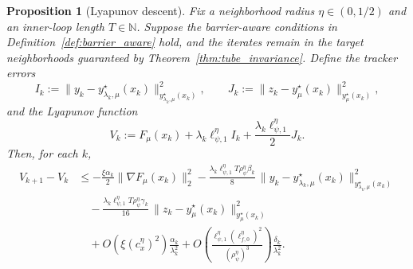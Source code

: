\documentclass{article}
\newtheorem{proposition}{Proposition}
\begin{document}
\begin{proposition}[Lyapunov descent]
\label{prop:lyapunov_descent}
Fix a neighborhood radius \(\eta\in(0,1/2)\) and an inner-loop length \(T\in\mathbb N\). Suppose the
\textit{barrier-aware} conditions in Definition~\ref{def:barrier_aware} hold, and the iterates remain in the
target neighborhoods guaranteed by Theorem~\ref{thm:tube_invariance}. Define the tracker errors
\begin{equation}
\label{eq:lyap_tracker_errors}
I_k
:=
\big\|y_k-y_{\lambda_k,\mu}^\star(x_k)\big\|_{y_{\lambda_k,\mu}^\star(x_k)}^2,
\qquad
J_k
:=
\big\|z_k-y_\mu^\star(x_k)\big\|_{y_\mu^\star(x_k)}^2,
\end{equation}
and the Lyapunov function
\begin{equation}
\label{eq:lyap_function}
V_k
:=
F_\mu(x_k)
+
\lambda_k\ell_{\psi,1}^\eta I_k
+
\frac{\lambda_k\ell_{\psi,1}^\eta}{2}J_k .
\end{equation}
Then, for each \(k\),
\begin{align}
V_{k+1}-V_k
&\le
-\frac{\xi\alpha_k}{2}\|\nabla F_\mu(x_k)\|_2^2
-\frac{\lambda_k\ell_{\psi,1}^\eta T\rho_\psi^\eta\beta_k}{8}\,
\big\|y_k-y_{\lambda_k,\mu}^\star(x_k)\big\|_{y_{\lambda_k,\mu}^\star(x_k)}^2
\nonumber\\
&\quad
-\frac{\lambda_k\ell_{\psi,1}^\eta T\rho_\psi^\eta\gamma_k}{16}\,
\big\|z_k-y_\mu^\star(x_k)\big\|_{y_\mu^\star(x_k)}^2
\nonumber\\
&\quad
+
O\!\left(\xi(c_x^\eta)^2\right)\frac{\alpha_k}{\lambda_k^2}
+
O\!\left(
\frac{\ell_{\psi,1}^\eta(\ell_{f,0}^\eta)^2}{(\rho_\psi^\eta)^3}
\right)
\frac{\delta_k}{\lambda_k^2}.
\label{eq:lyap_descent}
\end{align}
\end{proposition}
\end{document}
